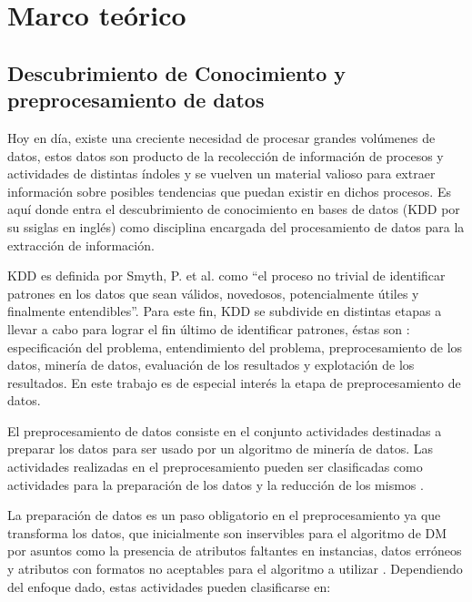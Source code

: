 \chapter{Marco teórico}
\label{capitulo1}

\section{Descubrimiento de Conocimiento y preprocesamiento de datos}

Hoy en día, existe una creciente necesidad de procesar grandes volúmenes de datos, estos datos son producto de la recolección de información de procesos y actividades de distintas índoles y se vuelven un material valioso para extraer información sobre posibles tendencias que puedan existir en dichos procesos. Es aquí donde entra el descubrimiento de conocimiento en bases de datos (KDD por su ssiglas en inglés) como disciplina encargada del procesamiento de datos para la extracción de información.

KDD es definida por Smyth, P. et al. \cite{fayyd1996data} como ``el proceso no trivial de identificar patrones en los datos que sean válidos, novedosos, potencialmente útiles y finalmente entendibles''. Para este fin, KDD se subdivide en distintas etapas a llevar a cabo para lograr el fin último de identificar patrones, éstas son \cite{garcia2016data}: especificación del problema, entendimiento del problema, preprocesamiento de los datos, minería de datos, evaluación de los resultados y explotación de los resultados. En este trabajo es de especial interés la etapa de preprocesamiento de datos.

El preprocesamiento de datos consiste en el conjunto actividades destinadas a preparar los datos para ser usado por un algoritmo de minería de datos. Las actividades realizadas en el preprocesamiento pueden ser clasificadas como actividades para la preparación de los datos y la reducción de los mismos \cite{garcia2016data}.

La preparación de datos es un paso obligatorio en el preprocesamiento ya que transforma los datos, que inicialmente son inservibles para el algoritmo de DM por asuntos como la presencia de atributos faltantes en instancias, datos erróneos y atributos con formatos no aceptables para el algoritmo a utilizar \cite{garcia2016data}. Dependiendo del enfoque dado, estas actividades pueden clasificarse en:

